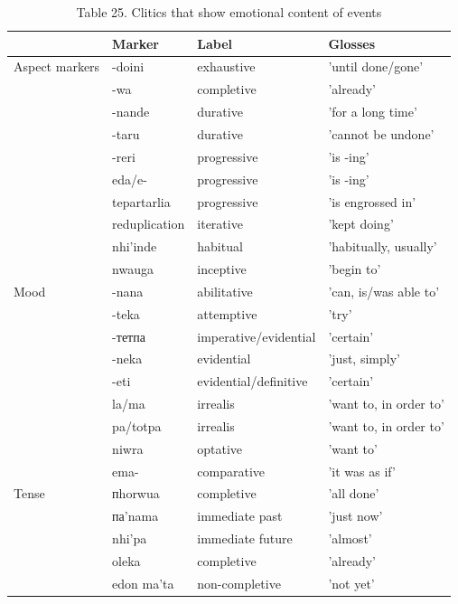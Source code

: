 \documentclass[10pt]{article}
\begin{document}
\begin{table}[h]
\begin{center}
\captionsetup{labelformat=empty}
\caption{Table 25. Clitics that show emotional content of events}
\begin{tabular}{|l|l|l|l|}
\hline
 & Marker & Label & Glosses \\
\hline
Aspect markers & -doini & exhaustive & 'until done/gone' \\
\hline
 & -wa & completive & 'already' \\
\hline
 & -nande & durative & 'for a long time' \\
\hline
 & -taru & durative & 'cannot be undone' \\
\hline
 & -reri & progressive & 'is -ing' \\
\hline
 & eda/e- & progressive & 'is -ing' \\
\hline
 & tepartarlia & progressive & 'is engrossed in' \\
\hline
 & reduplication & iterative & 'kept doing' \\
\hline
 & nhi'inde & habitual & 'habitually, usually' \\
\hline
 & nwauga & inceptive & 'begin to' \\
\hline
Mood & -nana & abilitative & 'can, is/was able to' \\
\hline
 & -teka & attemptive & 'try' \\
\hline
 & -тетпа & imperative/evidential & 'certain' \\
\hline
 & -neka & evidential & 'just, simply' \\
\hline
 & -eti & evidential/definitive & 'certain' \\
\hline
 & la/ma & irrealis & 'want to, in order to' \\
\hline
 & pa/totpa & irrealis & 'want to, in order to' \\
\hline
 & niwra & optative & 'want to' \\
\hline
 & ema- & comparative & 'it was as if' \\
\hline
Tense & пhorwua & completive & 'all done' \\
\hline
 & па'nama & immediate past & 'just now' \\
\hline
 & nhi'pa & immediate future & 'almost' \\
\hline
 & oleka & completive & 'already' \\
\hline
 & edon ma'ta & non-completive & 'not yet' \\
\hline
\end{tabular}
\end{center}
\end{table}
\end{document}
